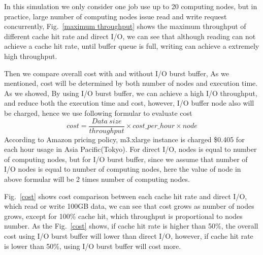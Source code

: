 In this simulation we only consider one job use up to 20 computing nodes, but in practice, large number of computing nodes issue read and write request concurrently, Fig.~\ref{maximum throughput} shows the maximum throughput of different cache hit rate and direct I/O, we can see that although reading can not achieve a cache hit rate, until buffer queue is full, writing can achieve a extremely high throughput.


Then we compare overall cost with and without I/O burst buffer, As we mentioned, cost will be determined by both number of nodes and execution time. 
As we showed, By using I/O burst buffer, we can achieve a high I/O throughput, and reduce both the execution time and cost, however, I/O buffer node also will be charged, hence we use following formular to evaluate cost
\[cost=\frac{Data~size}{throughput}\times cost\_per\_hour\times node\]
According to Amazon pricing policy, m3.xlarge instance is charged \$0.405 for each hour usage in Asia Pacific(Tokyo).
For direct I/O, nodes is equal to number of computing nodes, but for I/O burst buffer, since we assume that number of I/O nodes is equal to number of computing nodes, here the value of node in above formular will be 2 times number of computing nodes.

Fig.~\ref{cost} shows cost comparison between each cache hit rate and direct I/O, which read or write 100GB data, we can see that cost grows as number of nodes grows, except for 100\% cache hit, which throughput is proportional to nodes number.
As the Fig.~\ref{cost} shows, if cache hit rate is higher than 50\%, the overall cost using I/O burst buffer will lower than direct I/O, however, if cache hit rate is lower than 50\%, using I/O burst buffer will cost more.

